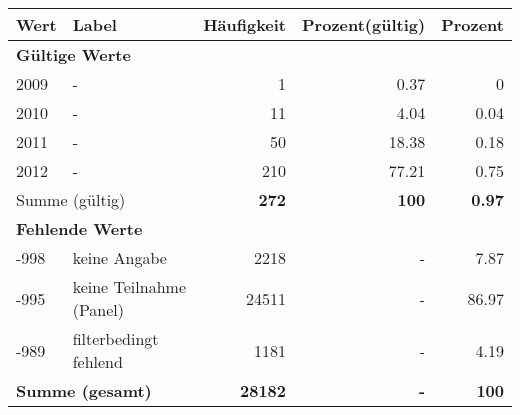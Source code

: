      \begin{longtable}{lXrrr}
     \toprule
     \textbf{Wert} & \textbf{Label} & \textbf{Häufigkeit} & \textbf{Prozent(gültig)} & \textbf{Prozent} \\
     \endhead
     \midrule
     \multicolumn{5}{l}{\textbf{Gültige Werte}}\\

     2009 &
     \multicolumn{1}{X}{ -  } &


       \num{1} &
       \num[round-mode=places,round-precision=2]{0,37} &
         \num[round-mode=places,round-precision=2]{0} \\

     2010 &
     \multicolumn{1}{X}{ -  } &


       \num{11} &
       \num[round-mode=places,round-precision=2]{4,04} &
         \num[round-mode=places,round-precision=2]{0,04} \\

     2011 &
     \multicolumn{1}{X}{ -  } &


       \num{50} &
       \num[round-mode=places,round-precision=2]{18,38} &
         \num[round-mode=places,round-precision=2]{0,18} \\

     2012 &
     \multicolumn{1}{X}{ -  } &


       \num{210} &
       \num[round-mode=places,round-precision=2]{77,21} &
         \num[round-mode=places,round-precision=2]{0,75} \\
     \midrule
     \multicolumn{2}{l}{Summe (gültig)} &
       \textbf{\num{272}} &
     \textbf{100} &
       \textbf{\num[round-mode=places,round-precision=2]{0,97}} \\
     \multicolumn{5}{l}{\textbf{Fehlende Werte}}\\
       -998 &
       keine Angabe &
         \num{2218} &
        - &
         \num[round-mode=places,round-precision=2]{7,87} \\
       -995 &
       keine Teilnahme (Panel) &
         \num{24511} &
        - &
         \num[round-mode=places,round-precision=2]{86,97} \\
       -989 &
       filterbedingt fehlend &
         \num{1181} &
        - &
         \num[round-mode=places,round-precision=2]{4,19} \\
     \midrule
     \multicolumn{2}{l}{\textbf{Summe (gesamt)}} &
          \textbf{\num{28182}} &
        \textbf{-} &
        \textbf{100} \\
     \bottomrule
     \end{longtable}
     
